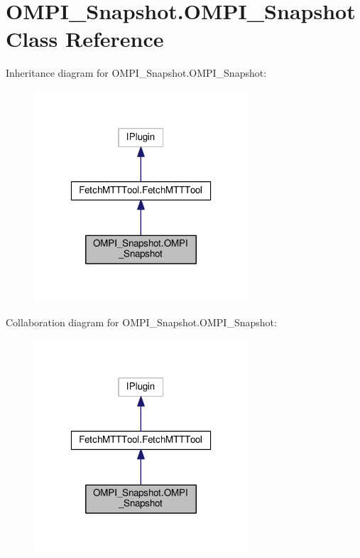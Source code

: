 \hypertarget{class_o_m_p_i___snapshot_1_1_o_m_p_i___snapshot}{\section{O\-M\-P\-I\-\_\-\-Snapshot.\-O\-M\-P\-I\-\_\-\-Snapshot Class Reference}
\label{class_o_m_p_i___snapshot_1_1_o_m_p_i___snapshot}
}


Inheritance diagram for O\-M\-P\-I\-\_\-\-Snapshot.\-O\-M\-P\-I\-\_\-\-Snapshot\-:
\nopagebreak
\begin{figure}[H]
\begin{center}
\leavevmode
\includegraphics[width=226pt]{class_o_m_p_i___snapshot_1_1_o_m_p_i___snapshot__inherit__graph}
\end{center}
\end{figure}


Collaboration diagram for O\-M\-P\-I\-\_\-\-Snapshot.\-O\-M\-P\-I\-\_\-\-Snapshot\-:
\nopagebreak
\begin{figure}[H]
\begin{center}
\leavevmode
\includegraphics[width=226pt]{class_o_m_p_i___snapshot_1_1_o_m_p_i___snapshot__coll__graph}
\end{center}
\end{figure}
